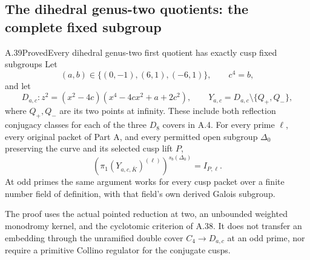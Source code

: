 \subsection{The dihedral genus-two quotients: the complete fixed subgroup}

\begin{statement}{A.39}{Proved}{Every dihedral genus-two first quotient has exactly cusp fixed subgroups}
Let
\[
 (a,b)\in\{(0,-1),(6,1),(-6,1)\},\qquad c^4=b,
\]
and let
\[
 D_{a,c}:z^2=(x^2-4c)(x^4-4cx^2+a+2c^2),
 \qquad Y_{a,c}=D_{a,c}\setminus\{Q_+,Q_-\},
\]
where \(Q_+,Q_-\) are its two points at infinity.
These include both reflection conjugacy classes for each
of the three \(D_8\) covers in A.4. For every prime
\(\ell\), every original packet of Part A, and every
permitted open subgroup \(\Delta_0\) preserving the
curve and its selected cusp lift \(P\),
\[
 \left(\pi_1(Y_{a,c,\bar K})^{(\ell)}\right)^{s_b(\Delta_0)}
                      =I_{P,\ell}.                    \tag{A.39.1}
\]
At odd primes the same argument works for every cusp
packet over a finite number field of definition, with
that field's own derived Galois subgroup.

The proof uses the actual pointed reduction at two,
an unbounded weighted monodromy kernel, and the
cyclotomic criterion of A.38. It does not transfer an
embedding through the unramified double cover
\(C_4\to D_{a,c}\) at an odd prime, nor require a
primitive Collino regulator for the conjugate cusps.
\end{statement}


